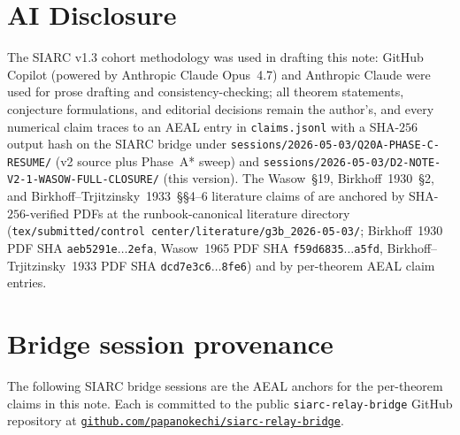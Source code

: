 \documentclass[11pt,reqno]{amsart}
\theoremstyle{plain}
\theoremstyle{definition}
\theoremstyle{remark}
\begin{document}
\section*{AI Disclosure}

The SIARC v1.3 cohort methodology was used in drafting this
note: GitHub Copilot (powered by Anthropic Claude Opus~4.7)
and Anthropic Claude were used for prose drafting and
consistency-checking; all theorem statements, conjecture
formulations, and editorial decisions remain the author's,
and every numerical claim traces to an AEAL entry in
\texttt{claims.jsonl} with a SHA-$256$ output hash on the
SIARC bridge under
\texttt{sessions/2026-05-03/Q20A-PHASE-C-RESUME/} (v2 source
plus Phase~A* sweep) and
\texttt{sessions/2026-05-03/D2-NOTE-V2-1-WASOW-FULL-CLOSURE/}
(this version).
The Wasow~\S19, Birkhoff~1930~\S2, and
Birkhoff--Trjitzinsky~1933~\S\S4--6 literature claims of
 are anchored by SHA-$256$-verified
PDFs at the runbook-canonical literature directory
(\texttt{tex/submitted/control center/literature/g3b\_2026-05-03/};
Birkhoff~1930 PDF SHA \texttt{aeb5291e$\dots$2efa},
Wasow~1965 PDF SHA \texttt{f59d6835$\dots$a5fd},
Birkhoff--Trjitzinsky~1933 PDF SHA \texttt{dcd7e3c6$\dots$8fe6})
and by per-theorem AEAL claim entries.

\appendix

\section{Bridge session provenance}
\label{app:provenance}

The following SIARC bridge sessions are the AEAL anchors for
the per-theorem claims in this note. Each is committed to
the public \texttt{siarc-relay-bridge} GitHub repository at
\href{https://github.com/papanokechi/siarc-relay-bridge}{\nolinkurl{github.com/papanokechi/siarc-relay-bridge}}.
\end{document}
